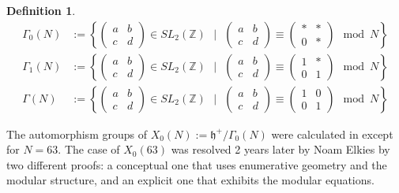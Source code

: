 \documentclass[12pt,reqno]{amsart}
\newcommand{\Z}{\mathbb{Z}}
\theoremstyle{definition}
\newtheorem{defn}{Definition}
\theoremstyle{remark}
\begin{document}
\begin{defn} 
\begin{align*} 
\Gamma_0(N) &:= \left\{ \begin{pmatrix} a & b \\ c & d \end{pmatrix} \in SL_2(\Z) \text{ }  \Big| \text{ } \begin{pmatrix} a & b \\ c & d \end{pmatrix} \equiv  \begin{pmatrix} * & * \\ 0 & * \end{pmatrix} \mod N \right\} \\
\Gamma_1(N) &:= \left\{ \begin{pmatrix} a & b \\ c & d \end{pmatrix} \in SL_2(\Z) \text{ }  \Big| \text{ }  \begin{pmatrix} a & b \\ c & d \end{pmatrix} \equiv  \begin{pmatrix} 1 & * \\ 0 & 1 \end{pmatrix} \mod N \right\} \\
\Gamma(N) &:= \left\{ \begin{pmatrix} a & b \\ c & d \end{pmatrix} \in SL_2(\Z) \text{ }  \Big| \text{ }  \begin{pmatrix} a & b \\ c & d \end{pmatrix} \equiv  \begin{pmatrix} 1 & 0 \\ 0 & 1 \end{pmatrix} \mod N \right\}
\end{align*}
 \end{defn} 

The automorphism groups of $X_0(N) := \mathfrak{h}^{+} / \Gamma_0(N)$ were calculated in \cite{km} except for $N=63$. The case of $X_0(63)$ was resolved 2 years later by Noam Elkies \cite{elkies} by two different proofs: a conceptual one that uses enumerative geometry and the modular structure, and an explicit one that exhibits the modular equations. 
\end{document}
